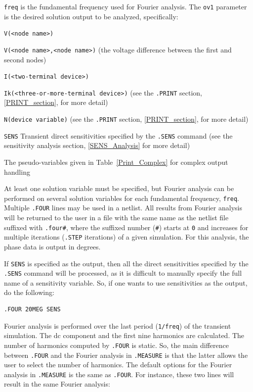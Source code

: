 \texttt{freq} is the fundamental frequency used for Fourier analysis.
The \texttt{ov1} parameter is the desired solution output to be analyzed, specifically:
\begin{XyceItemize}
\item \texttt{V(<node name>)}
\item \texttt{V(<node name>,<node name>)} (the voltage difference between the first and second nodes)
\item \texttt{I(<two-terminal device>)}
\item \texttt{Ik(<three-or-more-terminal device>)} (see the \texttt{.PRINT} section, \ref{PRINT_section}, for more detail)
\item \texttt{N(device variable)} (see the \texttt{.PRINT} section, \ref{PRINT_section}, for more detail)
\item \texttt{SENS} Transient direct sensitivities specified by the \texttt{.SENS} command  (see the sensitivity analysis section, \ref{SENS_Analysis} for more detail)
\item The pseudo-variables given in Table~\ref{Print_Complex} for complex output handling
\end{XyceItemize}
At least one solution variable must be specified, but
Fourier analysis can be performed on several solution variables for each 
fundamental frequency, \texttt{freq}.
Multiple \texttt{.FOUR} lines may be used in a netlist.  
All results from Fourier analysis will be returned to the user in a file 
with the same name as the netlist file suffixed with \texttt{.four\#}, where
the suffixed number (\texttt{\#}) starts at \texttt{0} and increases for multiple
iterations (\texttt{.STEP} iterations) of a given simulation.
For this analysis, the phase data is output in degrees.

If \texttt{SENS} is specified as the output, then all the direct sensitivities 
specified by the \texttt{.SENS} command will be processed, as it is difficult to 
manually specify the full name of a sensitivity variable.  So, if one wants 
to use sensitivities as the output, do the following:
\begin{verbatim}
.FOUR 20MEG SENS
\end{verbatim}

Fourier analysis is performed over the last period (\texttt{1/freq}) of 
the transient simulation.  The dc component and the first nine harmonics are calculated.
The number of harmonics computed by \texttt{.FOUR} is static.  So, the
main difference between \texttt{.FOUR} and the Fourier analysis in \texttt{.MEASURE} is that the latter allows the user to select the number of harmonics.  
The default options for the Fourier analysis in \texttt{.MEASURE} 
is the same as \texttt{.FOUR}.  For instance, these two lines will result in the 
same Fourier analysis:

